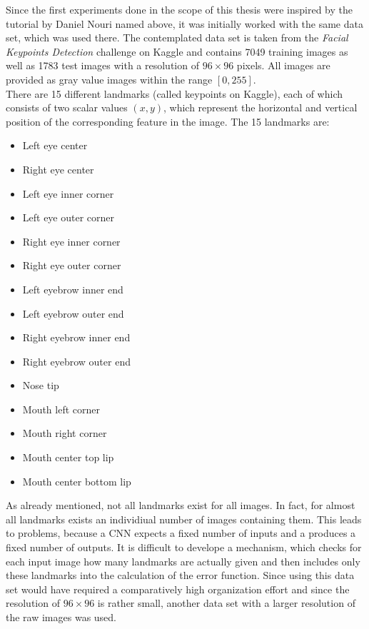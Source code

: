 \documentclass[11pt, a4paper]{article}
\begin{document}
Since the first experiments done in the scope of this thesis were inspired by the tutorial by Daniel Nouri named above, it was initially worked with the same data set, which was used there. The contemplated data set is taken from the \emph{Facial Keypoints Detection} challenge on Kaggle and contains 7049 training images as well as 1783 test images with a resolution of $96 \times 96$ pixels. All images are provided as gray value images within the range $[0,255]$.\\
There are 15 different landmarks (called keypoints on Kaggle), each of which consists of two scalar values $(x,y)$, which represent the horizontal and vertical position of the corresponding feature in the image. The 15 landmarks are:
\begin{multicols}{2}
	\begin{itemize}[itemsep=-2ex]
		\item Left eye center
		\item Right eye center
		\item Left eye inner corner
		\item Left eye outer corner
		\item Right eye inner corner
		\item Right eye outer corner
		\item Left eyebrow inner end
		\item Left eyebrow outer end
	\end{itemize}
\columnbreak
	\begin{itemize}[itemsep=-2ex]
		\item Right eyebrow inner end
		\item Right eyebrow outer end
		\item Nose tip
		\item Mouth left corner
		\item Mouth right corner
		\item Mouth center top lip
		\item Mouth center bottom lip
	\end{itemize}
	\vphantom{}
\end{multicols}
As already mentioned, not all landmarks exist for all images. In fact, for almost all landmarks exists an individiual number of images containing them. This leads to problems, because a \ac{CNN} expects a fixed number of inputs and a produces a fixed number of outputs. It is difficult to develope a mechanism, which checks for each input image how many landmarks are actually given and then includes only these landmarks into the calculation of the error function. Since using this data set would have required a comparatively high organization effort and since the resolution of $96 \times 96$ is rather small, another data set with a larger resolution of the raw images was used.
\end{document}
